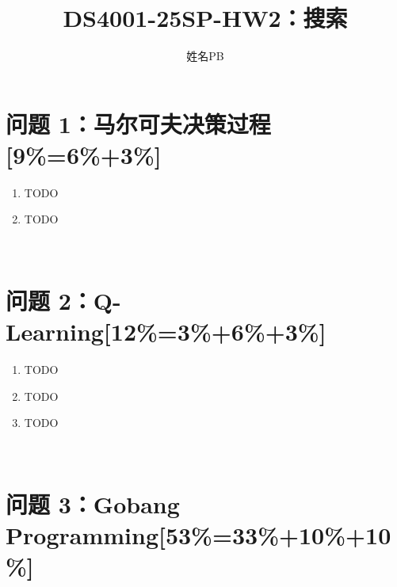 \documentclass{article}
\title{\bfseries DS4001-25SP-HW2：搜索}
\author{姓名\quad PB}
\begin{document}
\maketitle


\section{问题 1：马尔可夫决策过程[9\%=6\%+3\%]}

\begin{enumerate}[label=(\alph*), start=1]
    
    \item TODO %
    
    \item TODO %

\end{enumerate}
\

\section{问题 2：Q-Learning[12\%=3\%+6\%+3\%]}

\begin{enumerate}[label=(\alph*), start=1]

    \item TODO %
    
    \item TODO %
    
    \item TODO %
    
\end{enumerate}
\

\section{问题 3：Gobang Programming[53\%=33\%+10\%+10\%]}
\end{document}
